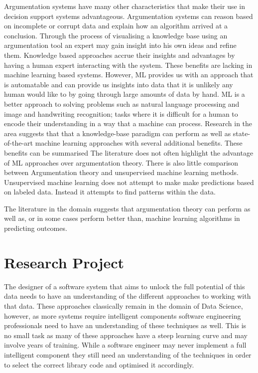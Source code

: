 Argumentation systems have many other characteristics that make their use in decision support systems advantageous. Argumentation systems can reason based on incomplete or corrupt data and explain how an algorithm arrived at a conclusion. Through the process of visualising a knowledge base using an argumentation tool an expert may gain insight into his own ideas and refine them. 
Knowledge based approaches accrue their insights and advantages by having a human expert interacting with the system. These benefits are lacking in machine learning based systems. However, ML provides us with an approach that is automatable and can provide us insights into data that it is unlikely any human would like to by going through large amounts of data by hand. ML is a better approach to solving problems such as natural language processing and image and handwriting recognition; tasks where it is difficult for a human to encode their understanding in a way that a machine can process.
Research in the area suggests that that a knowledge-base paradigm can perform as well as state-of-the-art machine learning approaches with several additional benefits. These benefits can be summarised The literature does not often highlight the advantage of ML approaches over argumentation theory. 
There is also little comparison between Argumentation theory and unsupervised machine learning methods. Unsupervised machine learning does not attempt to make make predictions based on labeled data. Instead it attempts to find patterns within the data.



The literature in the domain suggests that argumentation theory can perform as well as, or in some cases perform better than, machine learning algorithms in predicting outcomes. 





\section{Research Project}


The designer of a software system that aims to unlock the full potential of this data needs to have an understanding of the different approaches to working with that data. These approaches classically remain in the domain of Data Science, however, as more systems require intelligent components software engineering professionals need to have an understanding of these techniques as well. This is no small task as many of these approaches have a steep learning curve and may involve years of training. While a software engineer may never implement a full intelligent component they still need an understanding of the techniques in order to select the correct library code and optimised it accordingly.


